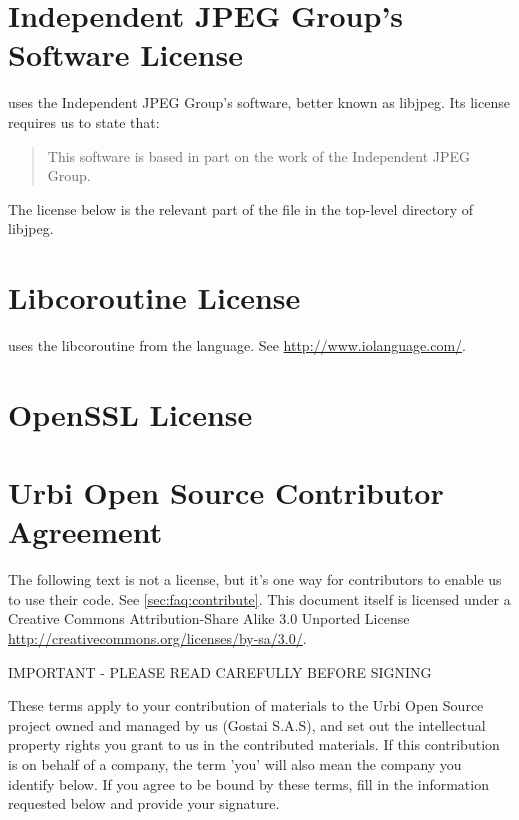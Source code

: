 
\section{Independent JPEG Group's Software License}

\usdk uses the Independent JPEG Group's software, better known as libjpeg.
Its license requires us to state that:

\begin{quote}
  This software is based in part on the work of the Independent JPEG Group.
\end{quote}

The license below is the relevant part of the  file in the
top-level directory of libjpeg.



\section{Libcoroutine License}

\urbi uses the libcoroutine from the  language.  See
\url{http://www.iolanguage.com/}.


\section{OpenSSL License}


\clearpage
\section{Urbi Open Source Contributor Agreement}
\label{sec:license:uosca}

The following text is not a license, but it's one way for \usdk contributors
to enable us to use their code.  See \autoref{sec:faq:contribute}.  This
document itself is licensed under a Creative Commons Attribution-Share Alike
3.0 Unported License \url{http://creativecommons.org/licenses/by-sa/3.0/}.


\begin{center}
  IMPORTANT - PLEASE READ CAREFULLY BEFORE SIGNING
\end{center}

These terms apply to your contribution of materials to the Urbi Open Source
project owned and managed by us (Gostai S.A.S), and set out the intellectual
property rights you grant to us in the contributed materials. If this
contribution is on behalf of a company, the term 'you' will also mean the
company you identify below. If you agree to be bound by these terms, fill in
the information requested below and provide your signature.

